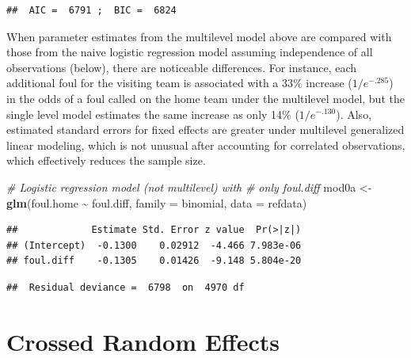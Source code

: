 \documentclass[
]{krantz}
\newenvironment{Shaded}{\begin{snugshade}}{\end{snugshade}}
\newcommand{\AttributeTok}[1]{\textcolor[rgb]{0.27,0.27,0.27}{#1}}
\newcommand{\CommentTok}[1]{\textcolor[rgb]{0.37,0.37,0.37}{\textit{#1}}}
\newcommand{\FunctionTok}[1]{\textcolor[rgb]{0.27,0.27,0.27}{\textbf{#1}}}
\newcommand{\NormalTok}[1]{#1}
\newcommand{\OtherTok}[1]{\textcolor[rgb]{0.37,0.37,0.37}{#1}}
\newcommand{\SpecialCharTok}[1]{\textcolor[rgb]{0.43,0.43,0.43}{\textbf{#1}}}
\begin{document}
\begin{verbatim}
##  AIC =  6791 ;  BIC =  6824
\end{verbatim}

When parameter estimates from the multilevel model above are compared with those from the naive logistic regression model assuming independence of all observations (below), there are noticeable differences. For instance, each additional foul for the visiting team is associated with a 33\% increase (\(1/e^{-.285}\)) in the odds of a foul called on the home team under the multilevel model, but the single level model estimates the same increase as only 14\% (\(1/e^{-.130}\)). Also, estimated standard errors for fixed effects are greater under multilevel generalized linear modeling, which is not unusual after accounting for correlated observations, which effectively reduces the sample size.

\begin{Shaded}
\begin{Highlighting}[]
\CommentTok{\# Logistic regression model (not multilevel) with }
\CommentTok{\#   only foul.diff}
\NormalTok{mod0a }\OtherTok{\textless{}{-}} \FunctionTok{glm}\NormalTok{(foul.home }\SpecialCharTok{\textasciitilde{}}\NormalTok{ foul.diff, }\AttributeTok{family =}\NormalTok{ binomial, }
             \AttributeTok{data =}\NormalTok{ refdata)}
\end{Highlighting}
\end{Shaded}

\begin{verbatim}
##             Estimate Std. Error z value  Pr(>|z|)
## (Intercept)  -0.1300    0.02912  -4.466 7.983e-06
## foul.diff    -0.1305    0.01426  -9.148 5.804e-20
\end{verbatim}

\begin{verbatim}
##  Residual deviance =  6798  on  4970 df
\end{verbatim}

\section{Crossed Random Effects}\label{crossedre}
\end{document}
